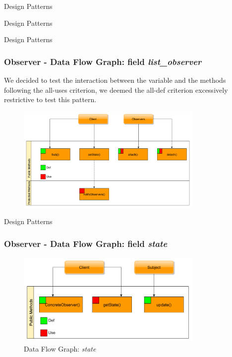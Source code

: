 \documentclass{beamer}
\begin{document}
\begin{section}{Design Patterns}
\begin{subsection}{Design Patterns}
\begin{frame}
	\end{frame}
\end{subsection}

\begin{subsection}{Design Patterns}
	\begin{frame}
		\frametitle{Observer - Data Flow Graph: field \textit{list\_observer}}
		
		We decided to test the interaction between the variable and the methods
		following the all-uses criterion, we deemed the all-def criterion excessively restrictive to test this pattern.
\begin{figure}[!h]
	\centering
	\includegraphics[width=0.8\textwidth]{./Observer/CallGraph.png}
	\label{Obdataflow1}
\end{figure} 		
	\end{frame}
\end{subsection}

\begin{subsection}{Design Patterns}
	\begin{frame}
		\frametitle{Observer - Data Flow Graph: field \textit{state}}
		
		\begin{figure}[!h]
			\centering
			\includegraphics[width=0.8\textwidth]{./Observer/CallGraph_State.png}
			\caption{Data Flow Graph: \textit{state}}
			\label{Obdataflow2}
		\end{figure}
		

\end{frame}
\end{subsection}
\end{section}
\end{document}
